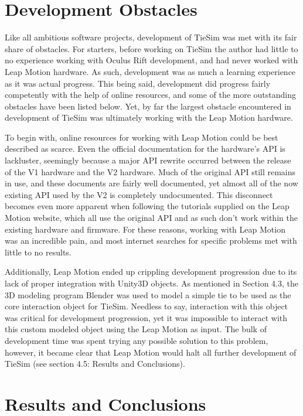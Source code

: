 \section{Development Obstacles}
\label{sec:obstacles}

Like all ambitious software projects, development of TieSim was met with its fair share of obstacles. For starters, before working on TieSim the author had little to no experience working with Oculus Rift development, and had never worked with Leap Motion hardware. As such, development was as much a learning experience as it was actual progress. This being said, development did progress fairly competently with the help of online resources, and some of the more outstanding obstacles have been listed below. Yet, by far the largest obstacle encountered in development of TieSim was ultimately working with the Leap Motion hardware. 

To begin with, online resources for working with Leap Motion could be best described as scarce. Even the official documentation for the hardware's API is lackluster, seemingly because a major API rewrite occurred between the release of the V1 hardware and the V2 hardware. Much of the original API still remains in use, and these documents are fairly well documented, yet almost all of the now existing API used by the V2 is completely undocumented. This disconnect becomes even more apparent when following the tutorials supplied on the Leap Motion website, which all use the original API and as such don't work within the existing hardware and firmware. For these reasons, working with Leap Motion was an incredible pain, and most internet searches for specific problems met with little to no results.

Additionally, Leap Motion ended up crippling development progression due to its lack of proper integration with Unity3D objects. As mentioned in Section 4.3, the 3D modeling program Blender was used to model a simple tie to be used as the core interaction object for TieSim. Needless to say, interaction with this object was critical for development progression, yet it was impossible to interact with this custom modeled object using the Leap Motion as input. The bulk of development time was spent trying any possible solution to this problem, however, it became clear that Leap Motion would halt all further development of TieSim (see section 4.5: Results and Conclusions).

\section{Results and Conclusions}
\label{sec:results}

